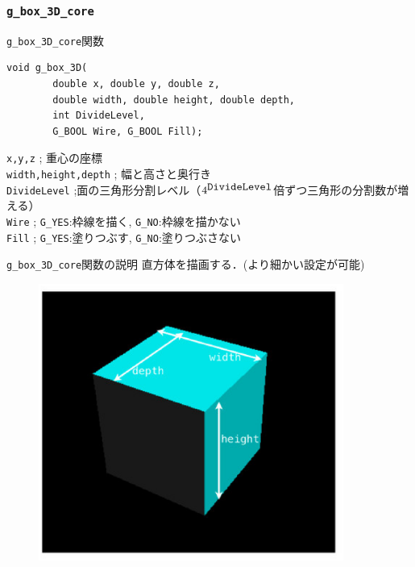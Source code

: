 \documentclass[platex,a4paper,12pt]{jsarticle}%
\begin{document}
\subsubsection{\texttt{g\_box\_3D\_core}}

\begin{itembox}[l]{\texttt{g\_box\_3D\_core}関数}
\begin{verbatim}
void g_box_3D(
        double x, double y, double z,
        double width, double height, double depth,
        int DivideLevel,
        G_BOOL Wire, G_BOOL Fill);   
\end{verbatim}
\verb|x,y,z| ; 重心の座標\\
\verb|width,height,depth| ; 幅と高さと奥行き\\
\verb|DivideLevel| ;面の三角形分割レベル（$4^{\verb|DivideLevel|}$倍ずつ三角形の分割数が増える）\\
\verb|Wire| ; \verb|G_YES|:枠線を描く, \verb|G_NO|:枠線を描かない \\
\verb|Fill| ; \verb|G_YES|:塗りつぶす, \verb|G_NO|:塗りつぶさない
\end{itembox}

\begin{itembox}[l]{\texttt{g\_box\_3D\_core}関数の説明}
直方体を描画する．(より細かい設定が可能)
\end{itembox}
\begin{figure}[htb]
	\includegraphics[width=100mm]{./Figures/eps/Canvas_g_box.eps}
\end{figure}
\end{document}
